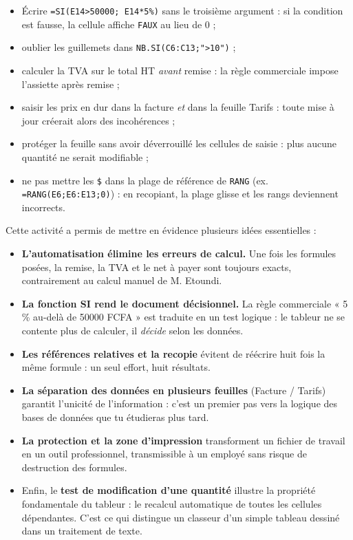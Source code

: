 \documentclass[11pt]{article}
\newcommand{\cle}[1]{{\popxbold\color{popdark}#1}}
\newcounter{popsec}
\newcounter{popsub}
\newcommand{\courssub}[1]{%
  \stepcounter{popsub}%
  \par\vspace{9pt}\noindent{\popxbold\fontsize{11.5}{13}\selectfont\color{popink}{\color{poporange}\thepopsec.\thepopsub}\hspace{6pt}#1}\par\nopagebreak\vspace{4pt}
}
\begin{document}
\begin{attention}
\begin{itemize}
\item Écrire \texttt{=SI(E14>50000; E14*5\%)} sans le troisième argument : si la condition est fausse, la cellule affiche \texttt{FAUX} au lieu de 0 ;
\item oublier les guillemets dans \texttt{NB.SI(C6:C13;">10")} ;
\item calculer la TVA sur le total HT \emph{avant} remise : la règle commerciale impose l'assiette après remise ;
\item saisir les prix en dur dans la facture \emph{et} dans la feuille Tarifs : toute mise à jour créerait alors des incohérences ;
\item protéger la feuille sans avoir déverrouillé les cellules de saisie : plus aucune quantité ne serait modifiable ;
\item ne pas mettre les \texttt{\$} dans la plage de référence de \texttt{RANG} (ex. \texttt{=RANG(E6;E6:E13;0)}) : en recopiant, la plage glisse et les rangs deviennent incorrects.
\end{itemize}
\end{attention}

\courssub{Bilan de l'activité}

Cette activité a permis de mettre en évidence plusieurs idées essentielles :

\begin{itemize}
\item \textbf{L'automatisation élimine les erreurs de calcul.} Une fois les formules posées, la remise, la TVA et le net à payer sont toujours exacts, contrairement au calcul manuel de M. Etoundi.
\item \textbf{La fonction SI rend le document décisionnel.} La règle commerciale « 5 \% au-delà de \num{50000} FCFA » est traduite en un test logique : le tableur ne se contente plus de calculer, il \emph{décide} selon les données.
\item \textbf{Les références relatives et la recopie} évitent de réécrire huit fois la même formule : un seul effort, huit résultats.
\item \textbf{La séparation des données en plusieurs feuilles} (Facture / Tarifs) garantit l'unicité de l'information : c'est un premier pas vers la logique des bases de données que tu étudieras plus tard.
\item \textbf{La protection et la zone d'impression} transforment un fichier de travail en un outil professionnel, transmissible à un employé sans risque de destruction des formules.
\item Enfin, le \textbf{test de modification d'une quantité} illustre la propriété fondamentale du tableur : le \cle{recalcul automatique} de toutes les cellules dépendantes. C'est ce qui distingue un classeur d'un simple tableau dessiné dans un traitement de texte.
\end{itemize}
\end{document}
